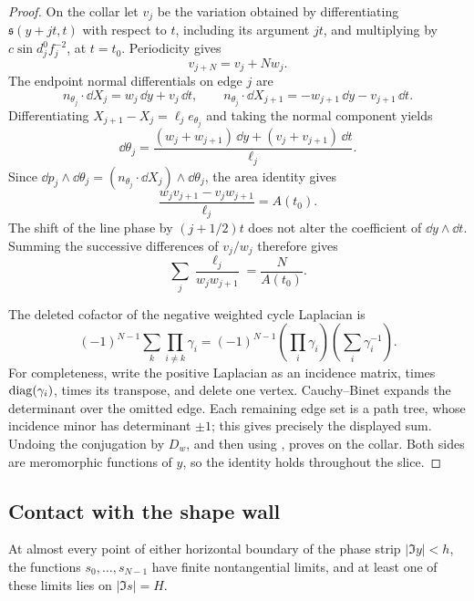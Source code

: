 \begin{proof}
On the collar let \(v_j\) be the variation obtained by differentiating
\(\mathfrak s(y+jt,t)\) with respect to \(t\), including its argument
\(jt\), and multiplying by \(c\sin d_j^0 f_j^{-2}\), at \(t=t_0\).
Periodicity gives
\[
 v_{j+N}=v_j+Nw_j.
\]
The endpoint normal differentials on edge \(j\) are
\[
 n_{\theta_j}\cdot\dd X_j=w_j\,\dd y+v_j\,\dd t,
 \qquad
 n_{\theta_j}\cdot\dd X_{j+1}
       =-w_{j+1}\,\dd y-v_{j+1}\,\dd t.
\]
Differentiating \(X_{j+1}-X_j=\ell_je_{\theta_j}\) and taking the normal
component yields
\[
 \dd\theta_j
   =\frac{(w_j+w_{j+1})\,\dd y+(v_j+v_{j+1})\,\dd t}{\ell_j}.
\]
Since
\(\dd p_j\wedge\dd\theta_j
 =(n_{\theta_j}\cdot\dd X_j)\wedge\dd\theta_j\), the area identity gives
\[
 \frac{w_jv_{j+1}-v_jw_{j+1}}{\ell_j}=A(t_0).
\]
The shift of the line phase by \((j+1/2)t\) does not alter the coefficient
of \(\dd y\wedge\dd t\).  Summing the successive differences of
\(v_j/w_j\) therefore gives
\begin{equation}
 \sum_j\frac{\ell_j}{w_jw_{j+1}}=\frac{N}{A(t_0)}.
 \label{odd:Wronskian-sum}
\end{equation}

The deleted cofactor of the negative weighted cycle Laplacian is
\[
 (-1)^{N-1}\sum_k\prod_{i\ne k}\gamma_i
   =(-1)^{N-1}\left(\prod_i\gamma_i\right)
                         \left(\sum_i\gamma_i^{-1}\right).
\]
For completeness, write the positive Laplacian as an incidence matrix,
times \(\operatorname{diag}(\gamma_i)\), times its transpose, and delete one vertex.
Cauchy--Binet expands the determinant over the omitted edge.  Each
remaining edge set is a path tree, whose incidence minor has determinant
\(\pm1\); this gives precisely the displayed sum.  Undoing the conjugation
by \(D_w\), and then using , proves
 on the collar.  Both sides are meromorphic functions of
\(y\), so the identity holds throughout the slice.
\end{proof}

\subsection{Contact with the shape wall}

\begin{theorem}
\label{thm:boundary-contact}
At almost every point of either horizontal boundary of the phase strip
\(|\Im y|<h\), the functions \(s_0,\ldots,s_{N-1}\) have finite
nontangential limits, and at least one of these limits lies on
\(|\Im s|=H\).
\end{theorem}

